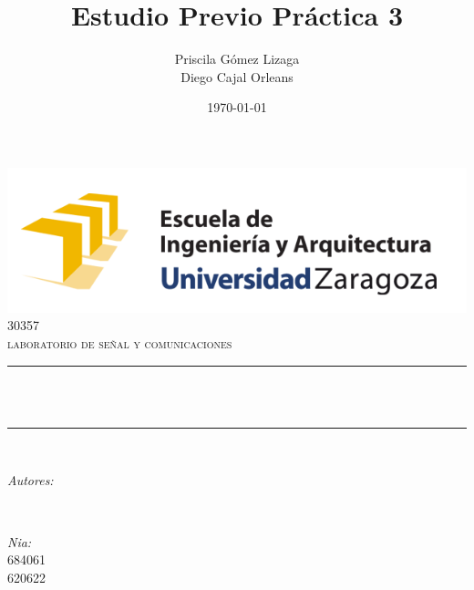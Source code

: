 \documentclass[12pt]{article}
\title{Estudio Previo Práctica 3}
\author{Priscila Gómez Lizaga \\ Diego Cajal Orleans}
\date{\today}
\makeatletter
\let\thetitle\@title
\let\theauthor\@author
\let\thedate\@date
\makeatother
\begin{document}

\begin{titlepage}
	\centering
    \vspace*{0.5 cm}
    \includegraphics[scale = 0.75]{eina.png}\\[1.0 cm]	%
	\textsc{\Large 30357}\\[0.5 cm]				%
	\textsc{\large laboratorio de señal y comunicaciones}\\[0.5 cm]				%
	\rule{\linewidth}{0.2 mm} \\[0.4 cm]
	\setlength{\baselineskip}{2\baselineskip}
	{ \huge \bfseries \thetitle}\\
	\rule{\linewidth}{0.2 mm} \\[1.5 cm]
	
	\begin{minipage}{0.4\textwidth}
		\begin{flushleft} \large
			\emph{Autores:}\\
			\theauthor
			\end{flushleft}
			\end{minipage}~
			\begin{minipage}{0.4\textwidth}
			\begin{flushright} \large
			\emph{Nia:} \\
			684061 \\
			620622
		\end{flushright}
	\end{minipage}\\[2 cm]
	
	{\large \thedate}\\[2 cm]
 
	\vfill
	
\end{titlepage}

\end{document}
